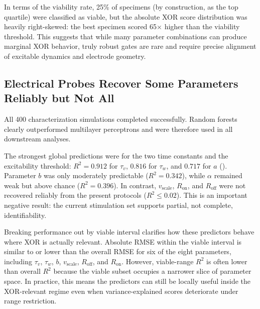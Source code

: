 \documentclass[letterpaper]{article}
\begin{document}
In terms of the viability rate, 25\% of specimens (by construction, as the top quartile) were classified as viable, but the absolute XOR score distribution was heavily right-skewed: the best specimen scored 65$\times$ higher than the viability threshold. This suggests that while many parameter combinations can produce marginal XOR behavior, truly robust gates are rare and require precise alignment of excitable dynamics and electrode geometry.

\subsection{Electrical Probes Recover Some Parameters Reliably but Not All}
All 400 characterization simulations completed successfully. Random forests clearly outperformed multilayer perceptrons and were therefore used in all downstream analyses.

\begin{table}[t]
\centering
\caption{Held-out random forest performance overall and within each parameter's viable interval. Viable intervals are taken from the XOR-viable range analysis. Lower viable-range $R^2$ values should be interpreted carefully because the target variance is smaller inside a restricted interval.}
\label{tab:ml}
\resizebox{\columnwidth}{!}{%
  
}
\end{table}

The strongest global predictions were for the two time constants and the excitability threshold: $R^2=0.912$ for $\tau_v$, $0.816$ for $\tau_w$, and $0.717$ for $a$ (). Parameter $b$ was only moderately predictable ($R^2=0.342$), while $\alpha$ remained weak but above chance ($R^2=0.396$). In contrast, $v_{\text{scale}}$, $R_{\mathrm{on}}$, and $R_{\mathrm{off}}$ were not recovered reliably from the present protocols ($R^2 \leq 0.02$). This is an important negative result: the current stimulation set supports partial, not complete, identifiability.

Breaking performance out by viable interval clarifies how these predictors behave where XOR is actually relevant. Absolute RMSE within the viable interval is similar to or lower than the overall RMSE for six of the eight parameters, including $\tau_v$, $\tau_w$, $b$, $v_{\text{scale}}$, $R_{\mathrm{off}}$, and $R_{\mathrm{on}}$. However, viable-range $R^2$ is often lower than overall $R^2$ because the viable subset occupies a narrower slice of parameter space. In practice, this means the predictors can still be locally useful inside the XOR-relevant regime even when variance-explained scores deteriorate under range restriction.
\end{document}

